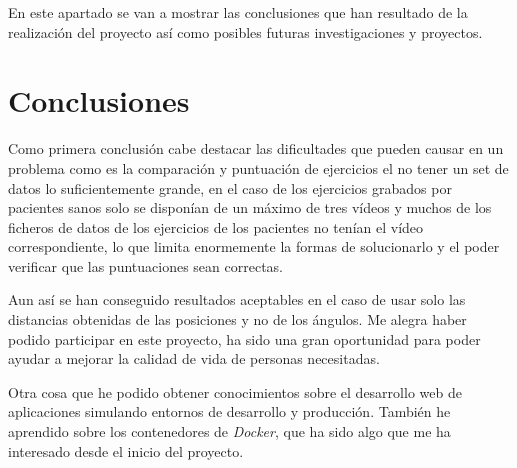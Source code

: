 
En este apartado se van a mostrar las conclusiones que han resultado de la realización del proyecto así como posibles futuras investigaciones y proyectos.

\section{Conclusiones}
Como primera conclusión cabe destacar las dificultades que pueden causar en un problema como es la comparación y puntuación de ejercicios el no tener un set de datos lo suficientemente grande, en el caso de los ejercicios grabados por pacientes sanos solo se disponían de un máximo de tres vídeos y muchos de los ficheros de datos de los ejercicios de los pacientes no tenían el vídeo correspondiente, lo que limita enormemente la formas de solucionarlo y el poder verificar que las puntuaciones sean correctas.

Aun así se han conseguido resultados aceptables en el caso de usar solo las distancias obtenidas de las posiciones y no de los ángulos. Me alegra haber podido participar en este proyecto, ha sido una gran oportunidad para poder ayudar a mejorar la calidad de vida de personas necesitadas.

Otra cosa que he podido obtener conocimientos sobre el desarrollo web de aplicaciones simulando entornos de desarrollo y producción. También he aprendido sobre los contenedores de \textit{Docker}, que ha sido algo que me ha interesado desde el inicio del proyecto. 


